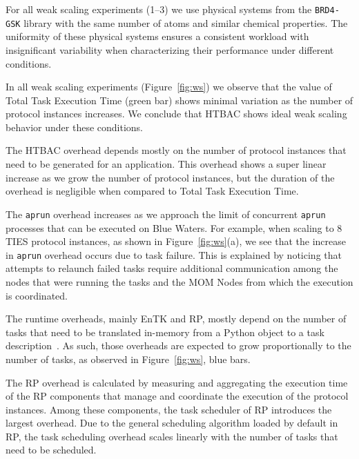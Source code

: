 For all weak scaling experiments (1--3) we use physical systems from the
\texttt{BRD4-GSK} library with the same number of atoms and similar chemical
properties. The uniformity of these physical systems ensures a consistent
workload with insignificant variability when characterizing their performance
under different conditions.


In all weak scaling experiments (Figure~\ref{fig:ws}) we observe that the
value of Total Task Execution Time (green bar) shows minimal variation as the
number of protocol instances increases. We conclude that HTBAC shows ideal
weak scaling behavior under these conditions.

The HTBAC overhead depends mostly on the number of protocol instances that
need to be generated for an application. This overhead shows a super linear
increase as we grow the number of protocol instances, but the duration of the
overhead is negligible when compared to Total Task Execution Time.

The \texttt{aprun} overhead increases as we approach the limit of concurrent
\texttt{aprun} processes that can be executed on Blue Waters. For example,
when scaling to 8 TIES protocol instances, as shown in
Figure~\ref{fig:ws}(a), we see that the increase in \texttt{aprun} overhead
occurs due to task failure. This is explained by noticing that attempts to
relaunch failed tasks require additional communication among the nodes that
were running the tasks and the MOM Nodes from which the execution is
coordinated.

The runtime overheads, mainly EnTK and RP, mostly depend on the number of
tasks that need to be translated in-memory from a Python object to a task
description~\cite{dakka2017,merzky2018}. As such, those overheads are
expected to grow proportionally to the number of tasks, as observed in
Figure~\ref{fig:ws}, blue bars.

The RP overhead is calculated by measuring and aggregating the execution time
of the RP components that manage and coordinate the execution of the protocol
instances. Among these components, the task scheduler of RP introduces the
largest overhead. Due to the general scheduling algorithm loaded by default
in RP, the task scheduling overhead scales linearly with the number of tasks that need to be scheduled.

